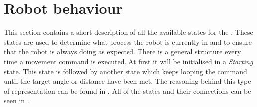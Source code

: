 \section{Robot behaviour} \label{sec:robot_behaviour}

This section contains a short description of all the available states for the \projname{}. These states are used to determine what process the robot is currently in and to ensure that the robot is always doing as expected. There is a general structure every time a movement command is executed. At first it will be initialised in a \emph{Starting} state. This state is followed by another state which keeps looping the command until the target angle or distance have been met. The reasoning behind this type of representation can be found in . All of the states and their connections can be seen in .

